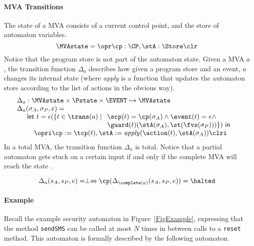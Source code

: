 \paragraph{MVA Transitions} The state of a MVA consists of a current control
point, and the store of automaton variables.
\[
\MVAstate = \opr \cp : \CP, \stA : \Store \clr
\]
Notice that the program store is not part of the automaton
state. Given a MVA \(a\), the transition function \(\Delta_a\)
describes how given a program store and an event, \(a\) changes its
internal state (where \textit{apply} is a function that updates the
automaton store according to the list of actions in the obvious way).
\[
\begin{array}{l}
\Delta_a  :  \MVAstate \times \Pstate \times \EVENT \hookrightarrow
\MVAstate\\
\Delta_a(\sigma_A, \sigma_P, e) = \\
\quad
\begin{array}[t]{l}
\mathsf{let\ }t = \epsilon(\{t\in \trans(a)\mid
  \begin{array}[t]{l}
     \scp(t) = \cp(\sigma_A) \wedge \event(t) = e \wedge \\
     \guard(t)(\stA(\sigma_A), \st(\fvs(\sigma_P)))\}) \mathsf{\ in}
  \end{array}\\
\quad \opri \cp := \tcp(t), \stA := \mathit{apply}(\action(t),
\stA(\sigma_A)) \clri
\end{array}

\end{array}
\]
In a total MVA, the transition function \(\Delta_a\) is total. Notice
that a partial automaton gets stuck on a certain input if and only if the
complete MVA will reach the state \halted.

\begin{equation}
\Delta_a(s_A, s_P, e) = \perp \Leftrightarrow
\cp (\Delta_{\complete(a)}(s_A, s_P, e)) = \halted
\end{equation}


\paragraph{Example}
Recall the example security automaton in Figure~\ref{FigExample},
expressing that the method \texttt{sendSMS} can
be called at most \(N\) times in between calls to a \texttt{reset}
method. This automaton is formally described by the following
automaton.

